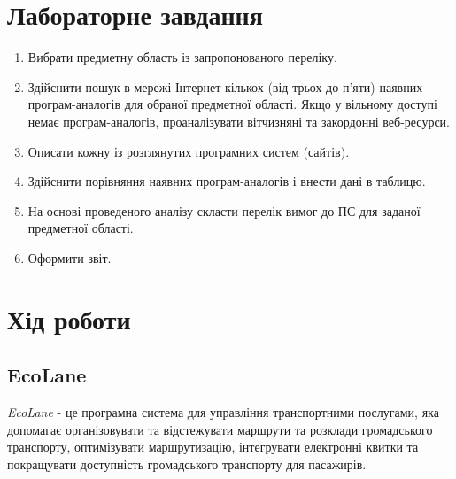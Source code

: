\documentclass[14pt]{extreport}
\begin{document}
\begin{normalsize}
	\section*{Лабораторне завдання}
	\begin{enumerate}
		\item Вибрати предметну область із запропонованого переліку.
		\item Здійснити пошук в мережі Інтернет кількох (від трьох до п'яти) наявних
		програм-аналогів для обраної предметної області. Якщо у вільному доступі немає
		програм-аналогів, проаналізувати вітчизняні та закордонні веб-ресурси.
		\item Описати кожну із розглянутих програмних систем (сайтів).
		\item Здійснити порівняння наявних програм-аналогів і внести дані в таблицю.
		\item На основі проведеного аналізу скласти перелік вимог до ПС для заданої
		предметної області.
		\item Оформити звіт.
	\end{enumerate}
	
	\section*{Хід роботи}
	
	\subsection*{EcoLane}
	\textit{EcoLane} - це програмна система для управління транспортними послугами, яка допомагає організовувати та відстежувати маршрути та розклади громадського транспорту, оптимізувати маршрутизацію, інтегрувати електронні квитки та покращувати доступність громадського транспорту для пасажирів.
	

\end{normalsize}
\end{document}
